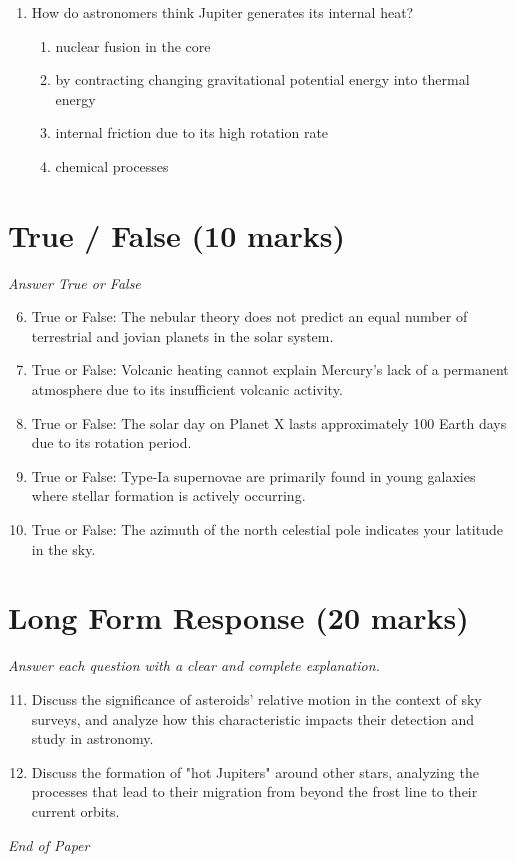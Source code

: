 \documentclass[12pt]{article}
\begin{document}
\begin{enumerate}[label=\arabic*.]
\begin{enumerate}[label=(\alph*)]
    \item it traps charged particles from Io's volcanoes in a "plasma torus" around the planet
    \item it causes spectacular auroral displays at Jupiter's north and south poles
    \item it switches polarity every 11 years
\end{enumerate}
\item How do astronomers think Jupiter generates its internal heat?
\begin{enumerate}[label=(\alph*)]
    \item nuclear fusion in the core
    \item by contracting changing gravitational potential energy into thermal energy
    \item internal friction due to its high rotation rate
    \item chemical processes
\end{enumerate}
\end{enumerate}

\section*{True / False (10 marks)}
\textit{Answer True or False}
\begin{enumerate}[label=\arabic*.]
\setcounter{enumi}{5}
\item True or False: The nebular theory does not predict an equal number of terrestrial and jovian planets in the solar system.
\item True or False: Volcanic heating cannot explain Mercury's lack of a permanent atmosphere due to its insufficient volcanic activity.
\item True or False: The solar day on Planet X lasts approximately 100 Earth days due to its rotation period.
\item True or False: Type-Ia supernovae are primarily found in young galaxies where stellar formation is actively occurring.
\item True or False: The azimuth of the north celestial pole indicates your latitude in the sky.
\end{enumerate}

\section*{Long Form Response (20 marks)}
\textit{Answer each question with a clear and complete explanation.}
\begin{enumerate}[label=\arabic*.]
\setcounter{enumi}{10}
\item Discuss the significance of asteroids' relative motion in the context of sky surveys, and analyze how this characteristic impacts their detection and study in astronomy.
\item Discuss the formation of "hot Jupiters" around other stars, analyzing the processes that lead to their migration from beyond the frost line to their current orbits.
\end{enumerate}

\vfill
\noindent\textit{End of Paper}
\end{document}
